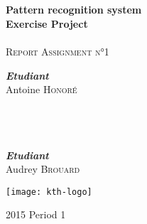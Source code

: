 \begin{titlepage}
  \begin{sffamily}
    \begin{center}

      \textsc{ }\\[1.5cm]

      \HRule \\[0.4cm]
      { \Huge \bfseries Pattern recognition system\\Exercise Project\\[0.4cm] }
      \HRule \\[2.5cm]
      \textsc{\LARGE Report Assignment n°1}~\\[2.5cm]
      \begin{minipage}{0.4\textwidth}
        \begin{flushleft} \large
          \emph{\textbf{Etudiant}}\\
          Antoine \textsc{Honoré}\\
          ~\\~\\~\\
        \end{flushleft}
      \end{minipage}
      \hfill
      \begin{minipage}{0.4\textwidth}
        \begin{flushright} \large
          \emph{\textbf{Etudiant}}\\
          Audrey \textsc{Brouard}\\
        \end{flushright}
      \end{minipage}
      \texttt{[image: kth-logo]}

     

      \vfill

      {\large 2015 Period 1}

    \end{center}
  \end{sffamily}

\end{titlepage}


